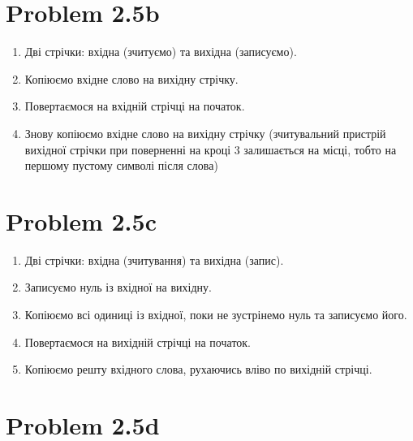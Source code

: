 \documentclass[12pt,letterpaper]{article}
\begin{document}
\section{Problem 2.5b}

\begin{enumerate}
    \item Дві стрічки: вхідна (зчитуємо) та вихідна (записуємо).

    \item Копіюємо вхідне слово на вихідну стрічку.

    \item Повертаємося на вхідній стрічці на початок.

    \item Знову копіюємо вхідне слово на вихідну стрічку (зчитувальний пристрій
        вихідної стрічки при поверненні на кроці 3 залишається на місці, тобто на
        першому пустому символі після слова)

\end{enumerate}

\section{Problem 2.5c}

\begin{enumerate}
    \item Дві стрічки: вхідна (зчитування) та вихідна (запис).
    \item Записуємо нуль із вхідної на вихідну.
    \item Копіюємо всі одиниці із вхідної, поки не зустрінемо нуль та записуємо його.
    \item Повертаємося на вихідній стрічці на початок.
    \item Копіюємо решту вхідного слова, рухаючись вліво по вихідній стрічці.

\end{enumerate}

\section{Problem 2.5d}
\end{document}

